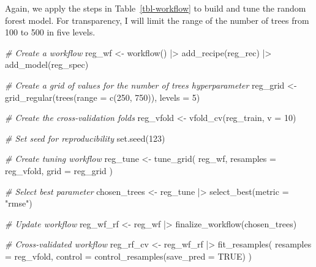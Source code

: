 \documentclass[
  letterpaper,
]{latex/krantz}
\newenvironment{Shaded}{\begin{snugshade}}{\end{snugshade}}
\newcommand{\AttributeTok}[1]{\textcolor[rgb]{0.00,0.00,0.00}{#1}}
\newcommand{\CommentTok}[1]{\textcolor[rgb]{0.00,0.00,0.00}{\textit{#1}}}
\newcommand{\ConstantTok}[1]{\textcolor[rgb]{0.00,0.00,0.00}{#1}}
\newcommand{\DecValTok}[1]{\textcolor[rgb]{0.00,0.00,0.00}{#1}}
\newcommand{\FunctionTok}[1]{\textcolor[rgb]{0.00,0.00,0.00}{#1}}
\newcommand{\NormalTok}[1]{\textcolor[rgb]{0.00,0.00,0.00}{#1}}
\newcommand{\OtherTok}[1]{\textcolor[rgb]{0.00,0.00,0.00}{#1}}
\newcommand{\SpecialCharTok}[1]{\textcolor[rgb]{0.00,0.00,0.00}{#1}}
\newcommand{\StringTok}[1]{\textcolor[rgb]{0.00,0.00,0.00}{#1}}
\theoremstyle{definition}
\theoremstyle{remark}
\begin{document}
Again, we apply the steps in Table~\ref{tbl-workflow} to build and tune
the random forest model. For transparency, I will limit the range of the
number of trees from 100 to 500 in five levels.

\begin{Shaded}
\begin{Highlighting}[]
\CommentTok{\# Create a workflow}
\NormalTok{reg\_wf }\OtherTok{\textless{}{-}}
  \FunctionTok{workflow}\NormalTok{() }\SpecialCharTok{|\textgreater{}}
  \FunctionTok{add\_recipe}\NormalTok{(reg\_rec) }\SpecialCharTok{|\textgreater{}}
  \FunctionTok{add\_model}\NormalTok{(reg\_spec)}

\CommentTok{\# Create a grid of values for the number of trees hyperparameter}
\NormalTok{reg\_grid }\OtherTok{\textless{}{-}}
  \FunctionTok{grid\_regular}\NormalTok{(}\FunctionTok{trees}\NormalTok{(}\AttributeTok{range =} \FunctionTok{c}\NormalTok{(}\DecValTok{250}\NormalTok{, }\DecValTok{750}\NormalTok{)), }\AttributeTok{levels =} \DecValTok{5}\NormalTok{)}

\CommentTok{\# Create the cross{-}validation folds}
\NormalTok{reg\_vfold }\OtherTok{\textless{}{-}} \FunctionTok{vfold\_cv}\NormalTok{(reg\_train, }\AttributeTok{v =} \DecValTok{10}\NormalTok{)}

\CommentTok{\# Set seed for reproducibility}
\FunctionTok{set.seed}\NormalTok{(}\DecValTok{123}\NormalTok{)}

\CommentTok{\# Create tuning workflow}
\NormalTok{reg\_tune }\OtherTok{\textless{}{-}}
  \FunctionTok{tune\_grid}\NormalTok{(}
\NormalTok{    reg\_wf,}
    \AttributeTok{resamples =}\NormalTok{ reg\_vfold,}
    \AttributeTok{grid =}\NormalTok{ reg\_grid}
\NormalTok{  )}

\CommentTok{\# Select best parameter}
\NormalTok{chosen\_trees }\OtherTok{\textless{}{-}}\NormalTok{ reg\_tune }\SpecialCharTok{|\textgreater{}} \FunctionTok{select\_best}\NormalTok{(}\AttributeTok{metric =} \StringTok{"rmse"}\NormalTok{)}

\CommentTok{\# Update workflow}
\NormalTok{reg\_wf\_rf }\OtherTok{\textless{}{-}}
\NormalTok{  reg\_wf }\SpecialCharTok{|\textgreater{}}
  \FunctionTok{finalize\_workflow}\NormalTok{(chosen\_trees)}

\CommentTok{\# Cross{-}validated workflow}
\NormalTok{reg\_rf\_cv }\OtherTok{\textless{}{-}}
\NormalTok{  reg\_wf\_rf }\SpecialCharTok{|\textgreater{}}
  \FunctionTok{fit\_resamples}\NormalTok{(}
    \AttributeTok{resamples =}\NormalTok{ reg\_vfold,}
    \AttributeTok{control =} \FunctionTok{control\_resamples}\NormalTok{(}\AttributeTok{save\_pred =} \ConstantTok{TRUE}\NormalTok{)}
\NormalTok{  )}
\end{Highlighting}
\end{Shaded}
\end{document}
